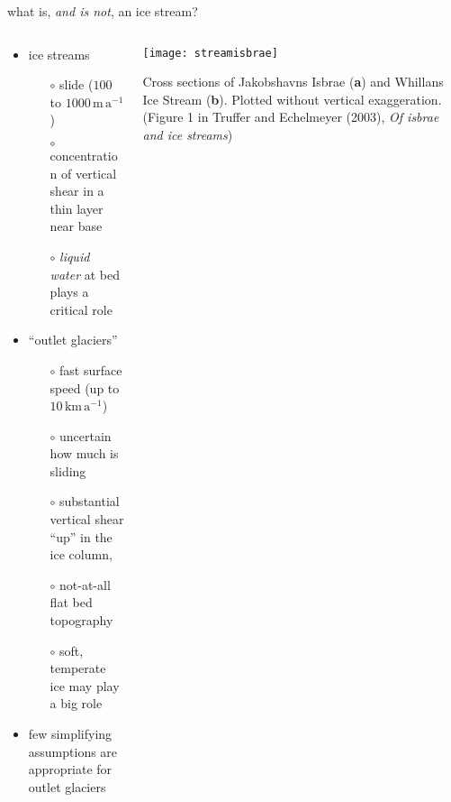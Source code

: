 \begin{frame}{what is, \emph{and is not}, an ice stream?}

\begin{columns}
\begin{column}{0.6\textwidth}
\begin{itemize}
\item ice streams 
  \small
  \begin{itemize}
  \item[$\circ$] slide ($100$ to $1000 \,\text{m}\,\text{a}^{-1}$)
  \item[$\circ$] concentration of vertical shear in a thin layer near base
  \item[$\circ$] \emph{liquid water} at bed plays a critical role 
  \end{itemize}
  \normalsize
\item ``outlet glaciers''
  \begin{itemize}
  \item[$\circ$] fast surface speed (up to $10 \,\text{km}\,\text{a}^{-1}$)
  \item[$\circ$] uncertain how much is sliding
  \item[$\circ$] substantial vertical shear ``up'' in the ice column,
  \item[$\circ$] not-at-all flat bed topography
  \item[$\circ$] soft, temperate ice may play a big role
  \end{itemize} 
\item \alert{few simplifying assumptions are appropriate for outlet glaciers}
\end{itemize}
\end{column}

\begin{column}{0.4\textwidth}
\texttt{[image: streamisbrae]}

\bigskip
\scriptsize 
Cross sections of Jakobshavns Isbrae (\textbf{a}) and
Whillans Ice Stream (\textbf{b}).  Plotted
without vertical exaggeration.  (\tiny Figure 1 in Truffer and Echelmeyer (2003), \emph{Of isbrae and ice streams}\scriptsize)
\end{column}
\end{columns}
\end{frame}


